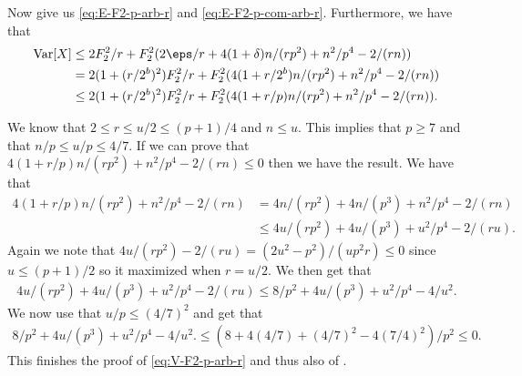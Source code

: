 Now  give us \eqref{eq:E-F2-p-arb-r}
and \eqref{eq:E-F2-p-com-arb-r}. Furthermore, we have that
\begin{align*}
    \Var[X] 
        &\le 2F_2^2/r + F_2^2 (2\eps/r + 4(1 + \delta)n / (rp^2) + n^2/p^4 - 2 /(rn))
        \\&= 2(1 + (r/2^b)^2)F_2^2/r + F_2^2(4(1 + r/2^b)n/(r p^2) + n^2/p^4 - 2/(rn)) 
        \\&\le 2(1 + (r/2^b)^2)F_2^2/r + F_2^2(4(1 + r/p)n/(r p^2) + n^2/p^4 - 2/(rn)) .
\end{align*}

We know that $2 \le r \le u/2 \le (p + 1)/4$ and $n \le u$.
This implies that $p \ge 7$ and that $n/p \le u/p \le 4/7$.
If we can prove that $4(1 + r/p)n / (rp^2) + n^2/p^4 - 2 / (rn) \le 0$ then
we have the result. We have that
\begin{align*}
   4(1 + r/p)n / (rp^2) + n^2/p^4 - 2 / (rn)
      &= 4 n/(rp^2) + 4 n /(p^3) + n^2/p^4 - 2/(rn)
      \\&\le 4u/(rp^2) + 4u/(p^3) + u^2/p^4 - 2/(ru) .
\end{align*}
Again we note that $4u/(r p^2) - 2/(ru) = (2u^2 - p^2)/(u p^2 r) \le 0$
since $u \le (p + 1)/2$ so it maximized when $r = u/2$. We then get
that
\begin{align*}
   4u/(r p^2) + 4u/(p^3) + u^2/p^4 - 2/(ru)
      \le 8/p^2 + 4u/(p^3) + u^2/p^4 - 4/u^2 .
\end{align*}
We now use that $u/p \le (4/7)^2$ and get that
\begin{align*}
   8/p^2 + 4u/(p^3) + u^2/p^4 - 4/u^2 .
      \le (8 + 4 (4/7) + (4/7)^2 - 4 (7/4)^2)/p^2
      \le 0 .
\end{align*}
This finishes the proof of \eqref{eq:V-F2-p-arb-r} and thus also of .

